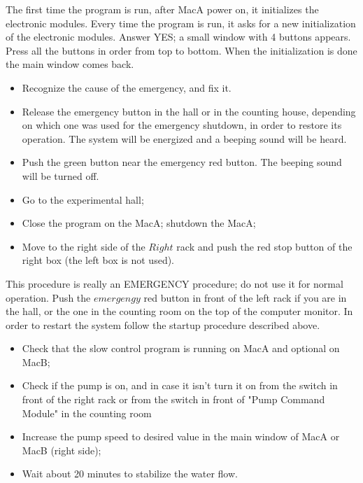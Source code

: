 The first time the program is run, after MacA power on, it initializes the
electronic modules. Every time the program is run, it asks for a new 
initialization of the electronic modules. Answer YES; a small window 
with 4 buttons appears. Press all the buttons  in order from top to bottom. 
When the initialization is done the main window comes back. \\


\begin{itemize}
  \item Recognize the cause of the emergency, and fix it.
  \item Release the emergency button in the hall or in the counting house, 
	depending on which one was used for the emergency shutdown, in order 
	to restore its operation. The system will be energized and a 
	beeping sound will be heard.
  \item Push the green button near the emergency red button. The beeping 
sound will be turned off.
\end{itemize}

 \vspace*{0.3cm}


\begin{itemize}
  \item Go to the experimental hall;
  \item Close the program on the MacA; shutdown the MacA;
  \item Move to the right side of the $Right$ rack and push the red 
stop button of the right box (the left box is not used).
\end{itemize}


This procedure is really an EMERGENCY procedure; do not use it for normal
operation.
 Push the $emergengy$ red button in front of the left rack if you are in the
hall, or the one in the counting room on the top of the computer monitor.
In order to restart the system follow the startup procedure described above. \\


\begin{itemize}
\item Check that the slow control program is running on MacA and optional
	on MacB;
\item  Check if the pump is on, and in case it isn't 
	turn it on from the switch in 
	front of the right rack or from the  switch in front of
 	"Pump Command  Module" in the counting room 
\item Increase the pump speed to desired value in the main window of 
	MacA or MacB (right side); 
\item Wait about 20 minutes to stabilize the water flow.
\end{itemize}

